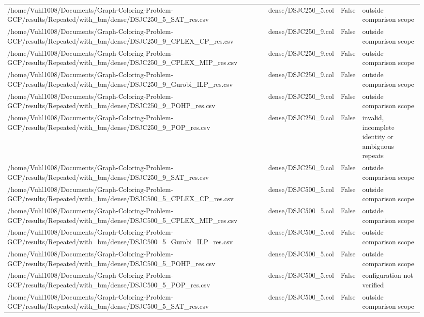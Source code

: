 \begin{table}[htbp]
\begin{tabular}{llll}
/home/Vuhl1008/Documents/Graph-Coloring-Problem-GCP/results/Repeated/with\_bm/dense/DSJC250\_5\_SAT\_res.csv & dense/DSJC250\_5.col & False & outside comparison scope \\
/home/Vuhl1008/Documents/Graph-Coloring-Problem-GCP/results/Repeated/with\_bm/dense/DSJC250\_9\_CPLEX\_CP\_res.csv & dense/DSJC250\_9.col & False & outside comparison scope \\
/home/Vuhl1008/Documents/Graph-Coloring-Problem-GCP/results/Repeated/with\_bm/dense/DSJC250\_9\_CPLEX\_MIP\_res.csv & dense/DSJC250\_9.col & False & outside comparison scope \\
/home/Vuhl1008/Documents/Graph-Coloring-Problem-GCP/results/Repeated/with\_bm/dense/DSJC250\_9\_Gurobi\_ILP\_res.csv & dense/DSJC250\_9.col & False & outside comparison scope \\
/home/Vuhl1008/Documents/Graph-Coloring-Problem-GCP/results/Repeated/with\_bm/dense/DSJC250\_9\_POHP\_res.csv & dense/DSJC250\_9.col & False & outside comparison scope \\
/home/Vuhl1008/Documents/Graph-Coloring-Problem-GCP/results/Repeated/with\_bm/dense/DSJC250\_9\_POP\_res.csv & dense/DSJC250\_9.col & False & invalid, incomplete identity or ambiguous repeats \\
/home/Vuhl1008/Documents/Graph-Coloring-Problem-GCP/results/Repeated/with\_bm/dense/DSJC250\_9\_SAT\_res.csv & dense/DSJC250\_9.col & False & outside comparison scope \\
/home/Vuhl1008/Documents/Graph-Coloring-Problem-GCP/results/Repeated/with\_bm/dense/DSJC500\_5\_CPLEX\_CP\_res.csv & dense/DSJC500\_5.col & False & outside comparison scope \\
/home/Vuhl1008/Documents/Graph-Coloring-Problem-GCP/results/Repeated/with\_bm/dense/DSJC500\_5\_CPLEX\_MIP\_res.csv & dense/DSJC500\_5.col & False & outside comparison scope \\
/home/Vuhl1008/Documents/Graph-Coloring-Problem-GCP/results/Repeated/with\_bm/dense/DSJC500\_5\_Gurobi\_ILP\_res.csv & dense/DSJC500\_5.col & False & outside comparison scope \\
/home/Vuhl1008/Documents/Graph-Coloring-Problem-GCP/results/Repeated/with\_bm/dense/DSJC500\_5\_POHP\_res.csv & dense/DSJC500\_5.col & False & outside comparison scope \\
/home/Vuhl1008/Documents/Graph-Coloring-Problem-GCP/results/Repeated/with\_bm/dense/DSJC500\_5\_POP\_res.csv & dense/DSJC500\_5.col & False & configuration not verified \\
/home/Vuhl1008/Documents/Graph-Coloring-Problem-GCP/results/Repeated/with\_bm/dense/DSJC500\_5\_SAT\_res.csv & dense/DSJC500\_5.col & False & outside comparison scope \\

\end{tabular}
\end{table}
